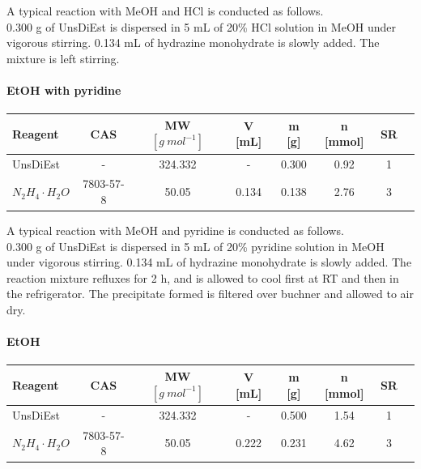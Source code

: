 \documentclass[../Master.tex]{subfiles}
\begin{document}
A typical reaction with MeOH and HCl is conducted as follows.\\
0.300 g of UnsDiEst is dispersed in 5 mL of 20\% HCl solution in MeOH under vigorous stirring. 0.134 mL of hydrazine monohydrate is slowly added. The mixture is left stirring.

\paragraph{EtOH with pyridine}

\begin{center}
	\begin{tabular}[b]{lccccccc}
		\toprule
		Reagent               & CAS       & MW \([g \ mol^{-1}]\) & V [mL] & m [g] & n [mmol] & SR \\
		\midrule
		UnsDiEst              & -         & 324.332               & -      & 0.300 & 0.92     & 1  \\
		\(N_2H_4 \cdot H_2O\) & 7803-57-8 & 50.05                 & 0.134  & 0.138 & 2.76     & 3  \\
		\bottomrule
	\end{tabular}
\end{center}

A typical reaction with MeOH and pyridine is conducted as follows. \\
0.300 g of UnsDiEst is dispersed in 5 mL of 20\% pyridine solution in MeOH under vigorous stirring. 0.134 mL of hydrazine monohydrate is slowly added. The reaction mixture refluxes for 2 h, and is allowed to cool first at RT and then in the refrigerator. The precipitate formed is filtered over buchner and allowed to air dry.

\paragraph{EtOH}

\begin{center}
	\begin{tabular}[b]{lccccccc}
		\toprule
		Reagent               & CAS       & MW \([g \ mol^{-1}]\) & V [mL] & m [g] & n [mmol] & SR \\
		\midrule
		UnsDiEst              & -         & 324.332               & -      & 0.500 & 1.54     & 1  \\
		\(N_2H_4 \cdot H_2O\) & 7803-57-8 & 50.05                 & 0.222  & 0.231 & 4.62     & 3  \\
		\bottomrule
	\end{tabular}
\end{center}
\end{document}
